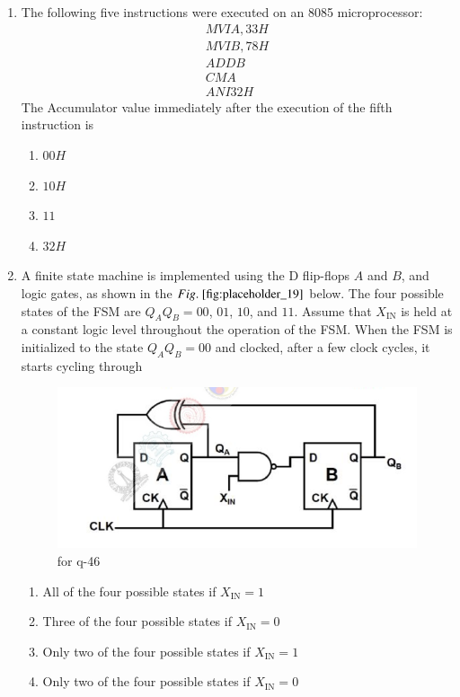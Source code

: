 \documentclass[journal,12pt,onecolumn]{IEEEtran}
\theoremstyle{remark}
\begin{document}
\begin{enumerate}
\hfill {}

\item The following five instructions were executed on an 8085 microprocessor:  
\begin{align*}
MVI A, 33H  
\\ MVI B, 78H
\\ ADD B  
\\ CMA  
\\ ANI 32H  
\end{align*}
The Accumulator value immediately after the execution of the fifth instruction is
\begin{multicols}{4}
\begin{enumerate}
\item $00H$
\item $10H$
\item $11$
\item $32H$
\end{enumerate}
\end{multicols}
\hfill {}

\item A finite state machine  is implemented using the D flip-flops $A$ and $B$, and logic gates, as shown in the $\figref{fig:placeholder_19}$ below. The four possible states of the FSM are $Q_A Q_B = 00$, $01$, $10$, and $11$. Assume that $X_{\text{IN}}$ is held at a constant logic level throughout the operation of the FSM. When the FSM is initialized to the state $Q_A Q_B = 00$ and clocked, after a few clock cycles, it starts cycling through
\begin{figure}[H]
    \centering
    \includegraphics[width=0.5\columnwidth]{figs/19.png}
    \caption{\centering for q-46}
    \label{fig:placeholder_19}
\end{figure}
\begin{multicols}{2}
\begin{enumerate}
\item All of the four possible states if $X_{\text{IN}} = 1$
\item Three of the four possible states if $X_{\text{IN}} = 0$
\item Only two of the four possible states if $X_{\text{IN}} = 1$
\item Only two of the four possible states if $X_{\text{IN}} = 0$
\end{enumerate}
\end{multicols}
\hfill {}


\end{enumerate}
\end{document}
